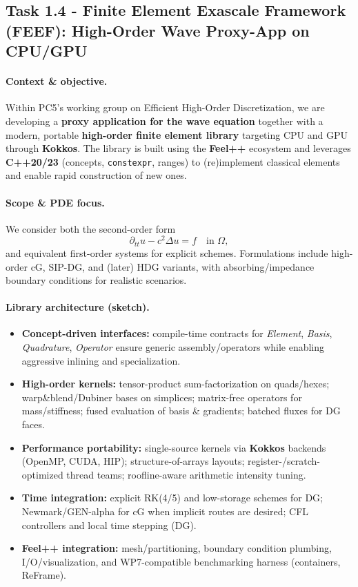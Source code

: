 \medskip

\subsection{Task 1.4 - Finite Element Exascale Framework (FEEF): High-Order Wave Proxy-App on CPU/GPU}
\label{sec:wp1:t1.4}

\paragraph{Context \& objective.}
Within PC5’s working group on Efficient High-Order Discretization, we are developing a \textbf{proxy application for the wave equation} together with a modern, portable \textbf{high-order finite element library} targeting CPU and GPU through \textbf{Kokkos}. The library is built using the \textbf{Feel++} ecosystem and leverages \textbf{C++20/23} (concepts, \texttt{constexpr}, ranges) to (re)implement classical elements and enable rapid construction of new ones.

\paragraph{Scope \& PDE focus.}
We consider both the second-order form
\[
  \partial_{tt} u - c^2 \Delta u = f \quad \text{in }\Omega,
\]
and equivalent first-order systems for explicit schemes. Formulations include high-order cG, SIP-DG, and (later) HDG variants, with absorbing/impedance boundary conditions for realistic scenarios.

\paragraph{Library architecture (sketch).}
\begin{itemize}
  \item \textbf{Concept-driven interfaces:} compile-time contracts for \emph{Element}, \emph{Basis}, \emph{Quadrature}, \emph{Operator} ensure generic assembly/operators while enabling aggressive inlining and specialization.
  \item \textbf{High-order kernels:} tensor-product sum-factorization on quads/hexes; warp\&blend/Dubiner bases on simplices; matrix-free operators for mass/stiffness; fused evaluation of basis \& gradients; batched fluxes for DG faces.
  \item \textbf{Performance portability:} single-source kernels via \textbf{Kokkos} backends (OpenMP, CUDA, HIP); structure-of-arrays layouts; register-/scratch-optimized thread teams; roofline-aware arithmetic intensity tuning.
  \item \textbf{Time integration:} explicit RK(4/5) and low-storage schemes for DG; Newmark/GEN-alpha for cG when implicit routes are desired; CFL controllers and local time stepping (DG).
  \item \textbf{Feel++ integration:} mesh/partitioning, boundary condition plumbing, I/O/visualization, and WP7-compatible benchmarking harness (containers, ReFrame).
\end{itemize}

